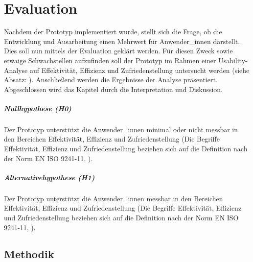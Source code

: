 \documentclass[Bachelorarbeit.tex]{subfiles}
\begin{document}
\chapter{Evaluation}
\label{chap:evalutation}




Nachdem der Prototyp implementiert wurde, stellt sich die Frage, ob die Entwicklung und Ausarbeitung einen Mehrwert für Anwender\_innen darstellt. 
Dies soll nun mittels der Evaluation geklärt werden.
Für diesen Zweck sowie etwaige Schwachstellen aufzufinden soll der Prototyp im Rahmen einer Usability-Analyse auf Effektivität, Effizienz und Zufriedenstellung \cite[vgl.][Abs.: 3]{Iso9241_11} untersucht werden (siehe Absatz: ).
Anschließend werden die Ergebnisse der Analyse präsentiert.
Abgeschlossen wird das Kapitel durch die Interpretation und Diskussion.


\paragraph{Nullhypothese (H0)}
Der Prototyp unterstützt die Anwender\_innen minimal oder nicht messbar in den Bereichen Effektivität, Effizienz und Zufriedenstellung (Die Begriffe Effektivität, Effizienz und Zufriedenstellung beziehen sich auf die Definition nach der Norm EN ISO 9241-11, \cite[vgl.][Abs.: 3]{Iso9241_11}).

\paragraph{Alternativehypothese (H1)}
Der Prototyp unterstützt die Anwender\_innen messbar in den Bereichen Effektivität, Effizienz und Zufriedenstellung (Die Begriffe Effektivität, Effizienz und Zufriedenstellung beziehen sich auf die Definition nach der Norm EN ISO 9241-11, \cite[vgl.][Abs.: 3]{Iso9241_11}).


\section{Methodik}
\label{Methodik}
\end{document}
